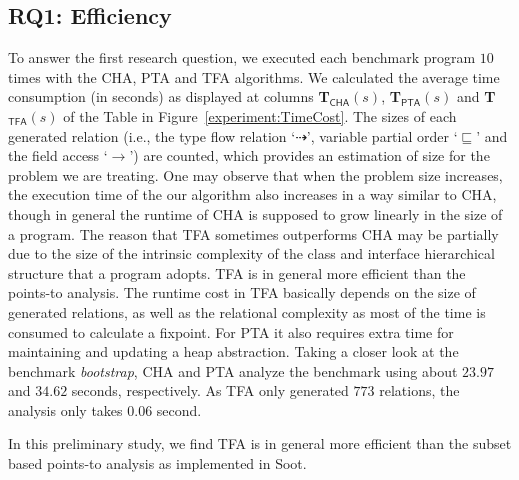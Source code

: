 \documentclass[runningheads]{llncs}
\newcommand{\less}{\sqsubseteq}
\newcommand{\tflow}{\dashrightarrow}
\begin{document}
\subsection{RQ1: Efficiency}\label{subsec:efficiency}
To answer the first research question, we executed each benchmark program $10$ times with the CHA, PTA and TFA algorithms. We calculated the average time consumption (in seconds) as displayed at columns \textbf{T$_{\textsf{CHA}}(s)$}, \textbf{T$_{\textsf{PTA}}(s)$} and \textbf{T$_{\textsf{TFA}}(s)$} of the Table in Figure~\ref{experiment:TimeCost}. The sizes of each generated relation (i.e., the type flow relation `$\tflow$', variable partial order `$\less$' and the field access `$\rightarrow$') are counted, which provides an estimation of size for the problem we are treating. One may observe that when the problem size increases, the execution time of the our algorithm also increases in a way similar to CHA, though in general the runtime of CHA is supposed to grow linearly in the size of a program. The reason that TFA sometimes outperforms CHA may be partially due to the size of the intrinsic complexity of the class and interface hierarchical structure that a program adopts. %
TFA is in general more efficient than the points-to analysis.
The runtime cost in TFA basically depends on the size of generated relations, as well as the relational complexity as most of the time is consumed to calculate a fixpoint. For PTA it also requires extra time for maintaining and updating a heap abstraction.
Taking a closer look at the benchmark \textit{bootstrap}, CHA and PTA analyze the benchmark using about $23.97$ and $34.62$ seconds, respectively. As TFA only generated $773$ relations, the analysis only takes $0.06$ second.

In this preliminary study, we find TFA is in general more efficient than the subset based points-to analysis as implemented in Soot.
\end{document}
